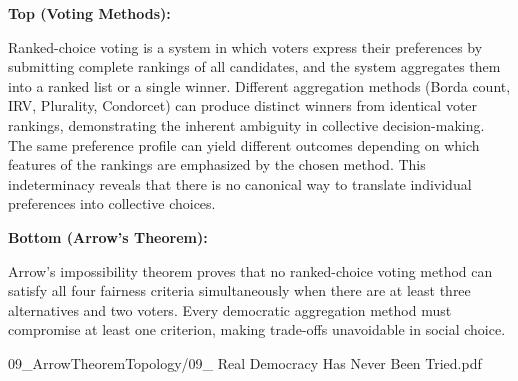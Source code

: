 \begin{SideNotePage}{
  \textbf{Top (Voting Methods):} \par Ranked-choice voting is a system in which voters express their preferences by submitting complete rankings of all candidates, and the system aggregates them into a ranked list or a single winner. Different aggregation methods (Borda count, IRV, Plurality, Condorcet) can produce distinct winners from identical voter rankings, demonstrating the inherent ambiguity in collective decision-making. The same preference profile can yield different outcomes depending on which features of the rankings are emphasized by the chosen method. This indeterminacy reveals that there is no canonical way to translate individual preferences into collective choices.


  \textbf{Bottom (Arrow's Theorem):} \par Arrow's impossibility theorem proves that no ranked-choice voting method can satisfy all four fairness criteria simultaneously when there are at least three alternatives and two voters. Every democratic aggregation method must compromise at least one criterion, making trade-offs unavoidable in social choice. 
}{09_ArrowTheoremTopology/09_ Real Democracy Has Never Been Tried.pdf}
\end{SideNotePage}